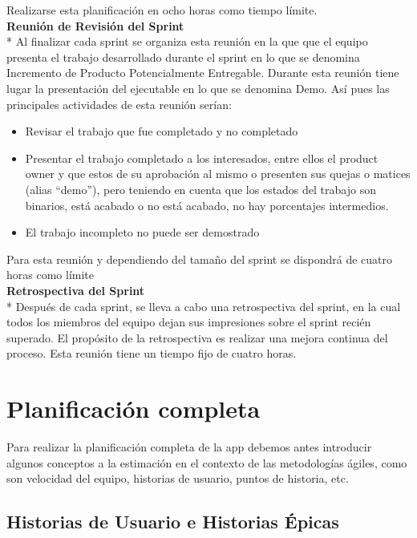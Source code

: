 \documentclass[../pfc.tex]{subfiles}
\begin{document}
	Realizarse esta planificación en ocho horas como tiempo límite.\\
	
	\textbf{Reunión de Revisión del Sprint}\\*
	Al finalizar cada sprint se organiza esta reunión en la que que el equipo presenta el trabajo desarrollado durante el sprint en lo que se denomina Incremento de Producto Potencialmente Entregable. Durante esta reunión tiene lugar la presentación del ejecutable en lo que se denomina Demo. Así pues las principales actividades de esta reunión serían:
	\begin{itemize} 
		\item Revisar el trabajo que fue completado y no completado 
		\item 	Presentar el trabajo completado a los interesados, entre ellos el product owner y que estos de su aprobación al mismo o presenten sus quejas o matices (alias “demo”), pero teniendo en cuenta que los estados del trabajo son binarios, está acabado o no está acabado, no hay porcentajes intermedios. 
		\item El trabajo incompleto no puede ser demostrado 
	\end{itemize}
	
	Para esta reunión y dependiendo del tamaño del sprint se dispondrá de cuatro horas como límite\\
	
	\textbf{Retrospectiva del Sprint }\\*
	Después de cada sprint, se lleva a cabo una retrospectiva del sprint, en la cual todos los miembros del equipo dejan sus impresiones sobre el sprint recién superado. El propósito de la retrospectiva es realizar una mejora continua del proceso. Esta reunión tiene un tiempo fijo de cuatro horas.
	
	\section{Planificación completa}
	
	Para realizar la planificación completa de la app debemos antes introducir algunos conceptos a la estimación en el contexto de las metodologías ágiles, como son velocidad del equipo, historias de usuario, puntos de historia, etc.    
	
	\subsection{Historias de Usuario e Historias Épicas}
	
\end{document}
